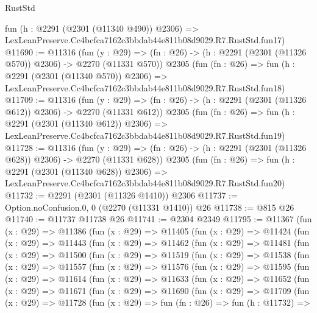 \begin{lexlean}{RustStd}
\begin{coremodule}
    fun (h : @2291 (@2301 (@11340 @490)) @2306) =>
    LexLeanPreserve.Cc4bcfca7162c3bbdab44e811b08d9029.R7.RustStd.fun17)
@11690 := @11316
    (fun (y : @29) => (fn : @26) -> (h : @2291 (@2301 (@11326 @570)) @2306) -> @2270 (@11331 @570))
    @2305
    (fun (fn : @26) =>
    fun (h : @2291 (@2301 (@11340 @570)) @2306) =>
    LexLeanPreserve.Cc4bcfca7162c3bbdab44e811b08d9029.R7.RustStd.fun18)
@11709 := @11316
    (fun (y : @29) => (fn : @26) -> (h : @2291 (@2301 (@11326 @612)) @2306) -> @2270 (@11331 @612))
    @2305
    (fun (fn : @26) =>
    fun (h : @2291 (@2301 (@11340 @612)) @2306) =>
    LexLeanPreserve.Cc4bcfca7162c3bbdab44e811b08d9029.R7.RustStd.fun19)
@11728 := @11316
    (fun (y : @29) => (fn : @26) -> (h : @2291 (@2301 (@11326 @628)) @2306) -> @2270 (@11331 @628))
    @2305
    (fun (fn : @26) =>
    fun (h : @2291 (@2301 (@11340 @628)) @2306) =>
    LexLeanPreserve.Cc4bcfca7162c3bbdab44e811b08d9029.R7.RustStd.fun20)
@11732 := @2291 (@2301 (@11326 @1410)) @2306
@11737 := Option.noConfusion.{0, 0} (@2270 (@11331 @1410)) @26
@11738 := @815 @26
@11740 := @11737 @11738 @26
@11741 := @2304 @2349
@11795 := @11367
    (fun (x : @29) =>
    @11386
      (fun (x : @29) =>
      @11405
        (fun (x : @29) =>
        @11424
          (fun (x : @29) =>
          @11443
            (fun (x : @29) =>
            @11462
              (fun (x : @29) =>
              @11481
                (fun (x : @29) =>
                @11500
                  (fun (x : @29) =>
                  @11519
                    (fun (x : @29) =>
                    @11538
                      (fun (x : @29) =>
                      @11557
                        (fun (x : @29) =>
                        @11576
                          (fun (x : @29) =>
                          @11595
                            (fun (x : @29) =>
                            @11614
                              (fun (x : @29) =>
                              @11633
                                (fun (x : @29) =>
                                @11652
                                  (fun (x : @29) =>
                                  @11671
                                    (fun (x : @29) =>
                                    @11690
                                      (fun (x : @29) =>
                                      @11709
                                        (fun (x : @29) =>
                                        @11728
                                          (fun (x : @29) =>
                                          fun (fn : @26) =>
                                          fun (h : @11732) =>

\end{coremodule}
\end{lexlean}
